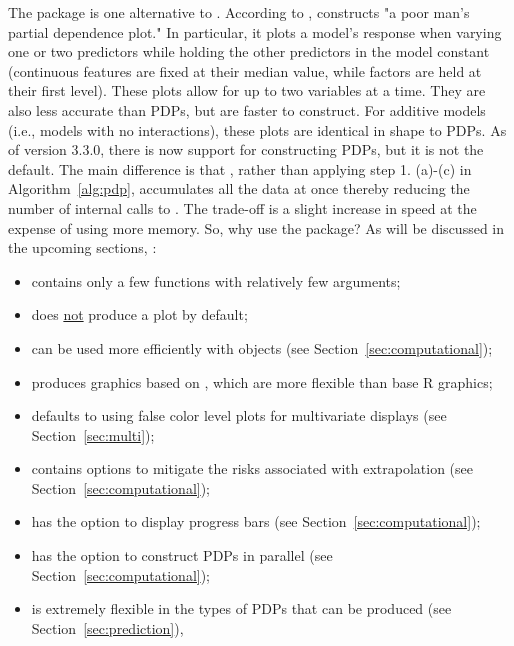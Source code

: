 The  package \citep{plotmo-pkg} is one alternative to . According to \citeauthor{plotmo-pkg},  constructs "a poor man's partial dependence plot." In particular, it plots a model's response when varying one or two predictors while holding the other predictors in the model constant (continuous features are fixed at their median value, while factors are held at their first level). These plots allow for up to two variables at a time. They are also less accurate than PDPs, but are faster to construct. For additive models (i.e., models with no interactions), these plots are identical in shape to PDPs. As of  version 3.3.0, there is now support for constructing PDPs, but it is not the default. The main difference is that , rather than applying step 1. (a)-(c) in Algorithm~\ref{alg:pdp}, accumulates all the data at once thereby reducing the number of internal calls to . The trade-off is a slight increase in speed at the expense of using more memory. So, why use the  package? As will be discussed in the upcoming sections, :
\begin{itemize}
  \item contains only a few functions with relatively few arguments;
  \item does \underline{not} produce a plot by default;
  \item can be used more efficiently with  objects (see Section~\ref{sec:computational});
  \item produces graphics based on  \citep{lattice-pkg}, which are more flexible than base R graphics;
  \item defaults to using false color level plots for multivariate displays (see Section~\ref{sec:multi});
  \item contains options to mitigate the risks associated with extrapolation (see Section~\ref{sec:computational});
  \item has the option to display progress bars (see Section~\ref{sec:computational});
  \item has the option to construct PDPs in parallel (see Section~\ref{sec:computational});
    \item is extremely flexible in the types of PDPs that can be produced (see Section~\ref{sec:prediction}),
\end{itemize}

